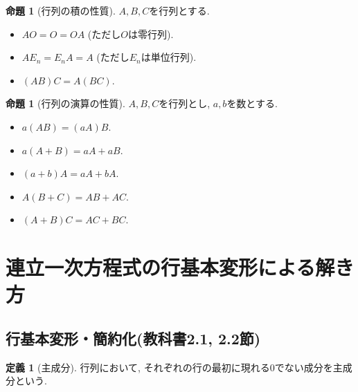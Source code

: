 \documentclass[dvipdfmx,a4paper,11pt]{article}
\theoremstyle{definition}
\newtheorem{prop}[thm]{命題}
\newtheorem{dfn}[thm]{定義}
\begin{document}
 \begin{tcolorbox}[
    colback = white,
    colframe = green!35!black,
    fonttitle = \bfseries,
    breakable = true]
    \begin{prop}[行列の積の性質]
$A,B,C$を行列とする.
 \begin{itemize}
 	\setlength{\parskip}{0cm}
  	\setlength{\itemsep}{0pt} 
 \item $AO =O = OA$ (ただし$O$は零行列).
  \item $AE_{n}=E_{n}A =A$ (ただし$E_n$は単位行列). 
  \item $(AB)C = A(BC)$.　
 \end{itemize}
  \end{prop}
 \end{tcolorbox}

 \begin{tcolorbox}[
    colback = white,
    colframe = green!35!black,
    fonttitle = \bfseries,
    breakable = true]
    \begin{prop}[行列の演算の性質]
$A,B,C$を行列とし, $a,b$を数とする.
 \begin{itemize}
 	\setlength{\parskip}{0cm}
  	\setlength{\itemsep}{0pt} 
 \item $a(AB)=(aA)B$. 
  \item $a(A+B)=aA + aB$. 
  \item $(a+b)A = aA + bA$.　
  \item $A(B+C) = AB + AC$.
  \item $(A+B)C = AC + BC$.
 \end{itemize}
  \end{prop}
 \end{tcolorbox}


\newpage


\section{連立一次方程式の行基本変形による解き方}
\label{sec-6}

\subsection{行基本変形・簡約化(教科書2.1, 2.2節)}

\begin{tcolorbox}[
    colback = white,
    colframe = green!35!black,
    fonttitle = \bfseries,
    breakable = true]
    \begin{dfn}[主成分]
  行列において, それぞれの行の最初に現れる0でない成分を主成分という.
  \end{dfn}
 \end{tcolorbox}
 
\end{document}
